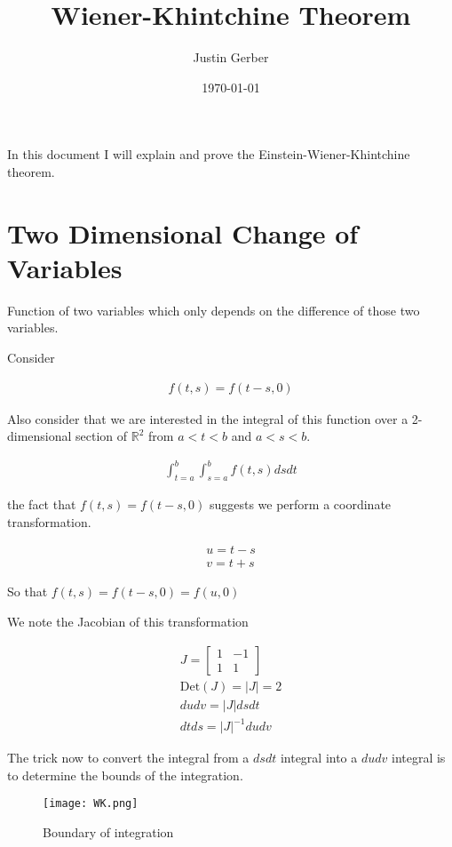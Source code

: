 \documentclass[12pt]{article}
\begin{document}
\title{Wiener-Khintchine Theorem}
\author{Justin Gerber}
\date{\today}
\maketitle

In this document I will explain and prove the Einstein-Wiener-Khintchine theorem.


\section{Two Dimensional Change of Variables}
Function of two variables which only depends on the difference of those two variables.

Consider

\begin{align}
f(t,s) = f(t-s,0)
\end{align}

Also consider that we are interested in the integral of this function over a 2-dimensional section of $\mathbb{R}^2$ from $a<t<b$ and $a<s<b$.

\begin{align}
\int_{t=a}^{b} \int_{s=a}^b f(t,s) ds dt
\end{align}

the fact that $f(t,s) = f(t-s,0)$ suggests we perform a coordinate transformation.

\begin{align}
u = t - s\\
v = t + s
\end{align}

So that $f(t,s) = f(t-s,0) = f(u,0)$

We note the Jacobian of this transformation

\begin{align}
J = 
\begin{bmatrix}
1 & -1\\
1 & 1
\end{bmatrix}\\
\text{Det}(J) = |J| = 2\\
dudv = |J| dsdt\\
dtds = |J|^{-1} dudv
\end{align}

The trick now to convert the integral from a $ds dt$ integral into a $du dv$ integral is to determine the bounds of the integration.

\begin{figure}[t]
\centering
\texttt{[image: WK.png]}
\caption{Boundary of integration}
\end{figure}
\end{document}
